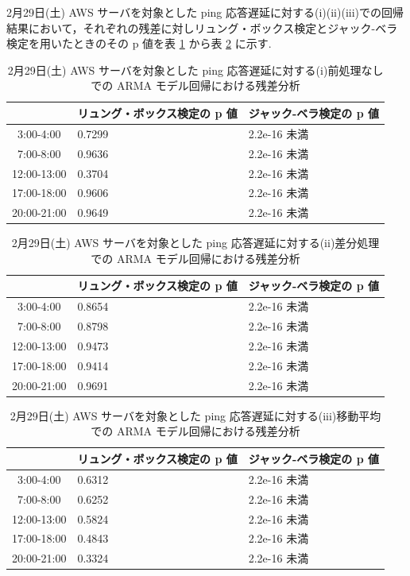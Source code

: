 \documentclass[a4j]{jarticle}
\begin{document}
2月29日(土) AWS サーバを対象とした ping 応答遅延に対する(i)(ii)(iii)での回帰結果において，それぞれの残差に対しリュング・ボックス検定とジャック-ベラ検定を用いたときのその p 値を表 \ref{t1} から表 \ref{t2} に示す.
\begin{table}[H]
\begin{center}
\caption{2月29日(土) AWS サーバを対象とした ping 応答遅延に対する(i)前処理なしでの ARMA モデル回帰における残差分析}
\label{t1}
\begin{tabular}{|c|l|l|}
\hline
 &リュング・ボックス検定の p 値&ジャック-ベラ検定の p 値\\
\hline
3:00-4:00&0.7299&2.2e-16 未満\\
\hline
7:00-8:00&0.9636&2.2e-16 未満\\
\hline
12:00-13:00&0.3704&2.2e-16 未満\\
\hline
17:00-18:00&0.9606&2.2e-16 未満\\
\hline
20:00-21:00&0.9649&2.2e-16 未満\\
\hline
\end{tabular}
\end{center}
\end{table}

\begin{table}[H]
\begin{center}
\caption{2月29日(土) AWS サーバを対象とした ping 応答遅延に対する(ii)差分処理での ARMA モデル回帰における残差分析}
\begin{tabular}{|c|l|l|}
\hline
 &リュング・ボックス検定の p 値&ジャック-ベラ検定の p 値\\
\hline
3:00-4:00&0.8654&2.2e-16 未満\\
\hline
7:00-8:00&0.8798&2.2e-16 未満\\
\hline
12:00-13:00&0.9473&2.2e-16 未満\\
\hline
17:00-18:00&0.9414&2.2e-16 未満\\
\hline
20:00-21:00&0.9691&2.2e-16 未満\\
\hline
\end{tabular}
\end{center}
\end{table}

\begin{table}[H]
\begin{center}
\caption{2月29日(土) AWS サーバを対象とした ping 応答遅延に対する(iii)移動平均での ARMA モデル回帰における残差分析}
\label{t2}
\begin{tabular}{|c|l|l|}
\hline
 &リュング・ボックス検定の p 値&ジャック-ベラ検定の p 値\\
\hline
3:00-4:00&0.6312&2.2e-16 未満\\
\hline
7:00-8:00&0.6252&2.2e-16 未満\\
\hline
12:00-13:00&0.5824&2.2e-16 未満\\
\hline
17:00-18:00&0.4843&2.2e-16 未満\\
\hline
20:00-21:00&0.3324&2.2e-16 未満\\
\hline
\end{tabular}
\end{center}
\end{table}
\end{document}
